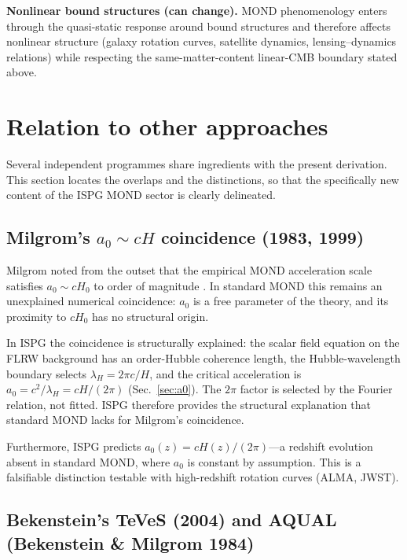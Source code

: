 \documentclass[11pt]{article}
\begin{document}
\textbf{Nonlinear bound structures (can change).} MOND phenomenology enters through the quasi-static response around bound structures and therefore affects nonlinear structure (galaxy rotation curves, satellite dynamics, lensing--dynamics relations) while respecting the same-matter-content linear-CMB boundary stated above.

\section{Relation to other approaches}\label{sec:other_approaches}

Several independent programmes share ingredients with the present
derivation.  This section locates the overlaps and the distinctions,
so that the specifically new content of the ISPG MOND sector is
clearly delineated.

\subsection[Milgrom's a0 approximately cH coincidence (1983, 1999)]{Milgrom's $a_0\sim cH$ coincidence (1983, 1999)}

Milgrom noted from the outset that the empirical MOND acceleration
scale satisfies $a_0\sim cH_0$ to order of magnitude
\cite{Milgrom1983,Milgrom1999}.  In standard MOND this remains an
unexplained numerical coincidence: $a_0$ is a free parameter of the
theory, and its proximity to $cH_0$ has no structural origin.

In ISPG the coincidence is structurally explained: the scalar field equation
on the FLRW background has an order-Hubble coherence length, the
Hubble-wavelength boundary selects
$\lambda_H=2\pi c/H$, and the critical acceleration is
$a_0=c^2/\lambda_H=cH/(2\pi)$ (Sec.~\ref{sec:a0}).  The $2\pi$
factor is selected by the Fourier relation, not fitted.  ISPG therefore
provides the structural explanation that standard MOND lacks for
Milgrom's coincidence.

Furthermore, ISPG predicts $a_0(z)=cH(z)/(2\pi)$---a redshift
evolution absent in standard MOND, where $a_0$ is constant by
assumption.  This is a falsifiable distinction testable with
high-redshift rotation curves (ALMA, JWST).

\subsection{Bekenstein's TeVeS (2004) and AQUAL (Bekenstein \& Milgrom 1984)}
\end{document}

